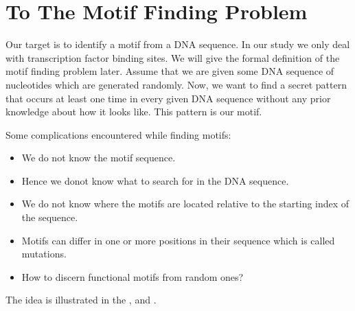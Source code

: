 \chapter{To The Motif Finding Problem}\label{motiffindingproblem}
Our target is to identify a motif from a DNA sequence. In our study
we only deal with transcription factor binding sites. We will give
the formal definition of the motif finding problem later. Assume
that we are given some DNA sequence of nucleotides which are generated
randomly. Now, we want to find a secret pattern that occurs at least
one time in every given DNA sequence without any prior knowledge
about how it looks like. This pattern is our motif.

Some complications encountered while finding motifs:
\begin{itemize}
	\item We do not know the motif sequence.
	\item Hence we donot know what to search for in the DNA sequence.
	\item We do not know where the motifs are located relative to
	the starting index of the sequence.
	\item Motifs can differ in one or more positions in their
	sequence which is called mutations.
	\item How to discern functional motifs from random ones?
	
\end{itemize}

The idea is illustrated in the , 
and .


